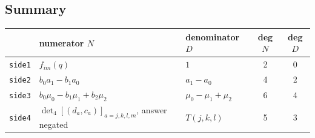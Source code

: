 \documentclass[11pt,a4paper]{article}
\newcommand{\code}[1]{\texttt{#1}}
\theoremstyle{remark}
\begin{document}
\subsection*{Summary}

\begin{center}
\begin{tabularx}{\linewidth}{@{}l L L c c@{}}
\toprule
 & numerator $N$ & denominator $D$ & deg $N$ & deg $D$ \\
\midrule
\code{side1} & $f_{im}(q)$ & $1$ & 2 & 0 \\
\code{side2} & $b_0a_1 - b_1a_0$ & $a_1 - a_0$ & 4 & 2 \\
\code{side3} & $b_0\mu_0 - b_1\mu_1 + b_2\mu_2$ & $\mu_0 - \mu_1 + \mu_2$ & 6 & 4 \\
\code{side4} & $\det_4[(d_a, c_a)]_{a=j,k,l,m}$, answer negated & $T(j,k,l)$ & 5 & 3 \\
\bottomrule
\end{tabularx}
\end{center}
\end{document}
